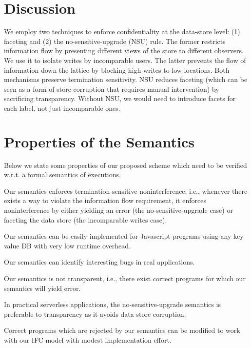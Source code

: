 \section{Discussion}

We employ two techniques to enforce confidentiality at the data-store
level: (1) faceting and (2) the no-sensitive-upgrade (NSU) rule.  The former
restricts information flow by presenting different views of the store
to different observers.  We use it to isolate writes by incomparable 
users.  The latter prevents the flow of information down the lattice by
blocking high writes to low locations.  Both mechanisms preserve
termination sensitivity.  NSU reduces faceting (which can be seen as a
form of store corruption that requires manual intervention) by
sacrificing transparency.  Without NSU, we would need to introduce
facets for each label, not just incomparable ones.

\section{Properties of the Semantics}

Below we state some properties of our proposed scheme which need to be verified w.r.t.
a formal semantics of executions.

\begin{conj}
Our semantics enforces termination-sensitive noninterference, i.e., whenever there exists
a way to violate the information flow requirement, it enforces noninterference by either yielding an error (the no-sensitive-upgrade case)
or faceting the data store (the incomparable writes case).
\end{conj}

\begin{conj}
Our semantics can be easily implemented for Javascript programs using
any key value DB with very low runtime overhead.
\end{conj}

\begin{conj}
Our semantics can identify interesting bugs in real applications.
\end{conj}

\begin{conj}
Our semantics is not transparent, i.e., there exist correct programs for which our semantics
will yield error.
\end{conj}

\begin{conj}
In practical serverless applications, the no-sensitive-upgrade semantics is preferable to transparency
as it avoids data store corruption.
\end{conj}

\begin{conj}
Correct programs which are rejected by our semantics can be modified to work with our IFC model with modest implementation effort.
\end{conj}

